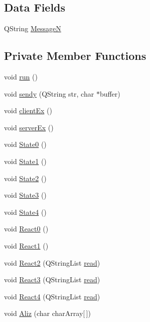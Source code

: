 \subsection*{Data Fields}
\begin{DoxyCompactItemize}
\item 
Q\+String \mbox{\hyperlink{class_thread_a15698411cab05d061db35b2cc3e4299e}{MessageN}}
\end{DoxyCompactItemize}
\subsection*{Private Member Functions}
\begin{DoxyCompactItemize}
\item 
void \mbox{\hyperlink{class_thread_ad9373d8d725c46717dfce3130018fe3a}{run}} ()
\item 
void \mbox{\hyperlink{class_thread_a4146abfb147f50ec1f12861a8d19bdbc}{sendy}} (Q\+String str, char $\ast$buffer)
\item 
void \mbox{\hyperlink{class_thread_a852c3ba7d23b38d01e21a568f3e068d3}{client\+Ex}} ()
\item 
void \mbox{\hyperlink{class_thread_a3d30026f53648772a9d7a87dfb9d4472}{server\+Ex}} ()
\item 
void \mbox{\hyperlink{class_thread_a8aec2c879ec2f091a5a2c13479eb37ad}{State0}} ()
\item 
void \mbox{\hyperlink{class_thread_ac8fa1a7c29e2c09fed3a16c49c59b32a}{State1}} ()
\item 
void \mbox{\hyperlink{class_thread_aff26f1fb31bf2a610065e584338a2aa4}{State2}} ()
\item 
void \mbox{\hyperlink{class_thread_af850fa46507b1738f624e495f1e14c1e}{State3}} ()
\item 
void \mbox{\hyperlink{class_thread_acf42fbee7bf6fea082344560ab6044f0}{State4}} ()
\item 
void \mbox{\hyperlink{class_thread_ae7901935e36a5fec4dba4db73fd00cbe}{React0}} ()
\item 
void \mbox{\hyperlink{class_thread_a1f4fe3b88fc87bab5246ebea0167413b}{React1}} ()
\item 
void \mbox{\hyperlink{class_thread_a2f6f8970c77f9dd30ab9d15271980f98}{React2}} (Q\+String\+List \mbox{\hyperlink{class_thread_a45dce23a8d89cb27b41f8823df44765b}{read}})
\item 
void \mbox{\hyperlink{class_thread_ae2837ccfe468e07e4be85bcffea20cb7}{React3}} (Q\+String\+List \mbox{\hyperlink{class_thread_a45dce23a8d89cb27b41f8823df44765b}{read}})
\item 
void \mbox{\hyperlink{class_thread_a6fca79a0d729f44cef7e84ef8ef3c527}{React4}} (Q\+String\+List \mbox{\hyperlink{class_thread_a45dce23a8d89cb27b41f8823df44765b}{read}})
\item 
void \mbox{\hyperlink{class_thread_a49dfdb57b8e29858c9fa3f33c5db327d}{Aliz}} (char char\+Array\mbox{[}$\,$\mbox{]})
\end{DoxyCompactItemize}
